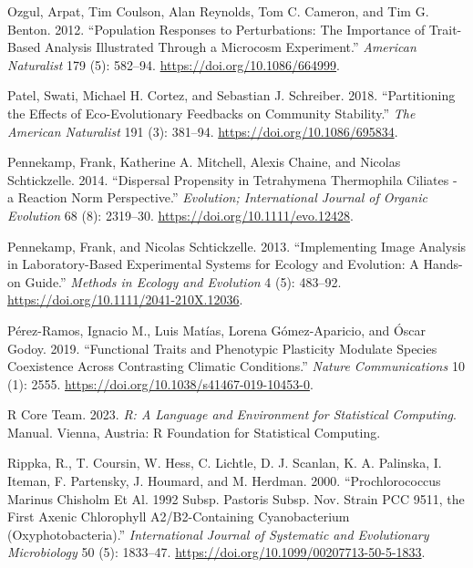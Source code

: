 \documentclass[
  letterpaper,
  DIV=11,
  numbers=noendperiod]{scrartcl}
\newlength{\cslhangindent}
\newenvironment{CSLReferences}[2] %
 {\begin{list}{}{%
  \setlength{\itemindent}{0pt}
  \setlength{\leftmargin}{0pt}
  \setlength{\parsep}{0pt}
  \ifodd #1
   \setlength{\leftmargin}{\cslhangindent}
   \setlength{\itemindent}{-1\cslhangindent}
  \fi
  \setlength{\itemsep}{#2\baselineskip}}}
 {\end{list}}
\begin{document}
\begin{CSLReferences}{1}{0}
Ozgul, Arpat, Tim Coulson, Alan Reynolds, Tom C. Cameron, and Tim G.
Benton. 2012. {``Population Responses to Perturbations: {The} Importance
of Trait-Based Analysis Illustrated Through a Microcosm Experiment.''}
\emph{American Naturalist} 179 (5): 582--94.
\url{https://doi.org/10.1086/664999}.

Patel, Swati, Michael H. Cortez, and Sebastian J. Schreiber. 2018.
{``Partitioning the {Effects} of {Eco-Evolutionary Feedbacks} on
{Community Stability}.''} \emph{The American Naturalist} 191 (3):
381--94. \url{https://doi.org/10.1086/695834}.

Pennekamp, Frank, Katherine A. Mitchell, Alexis Chaine, and Nicolas
Schtickzelle. 2014. {``Dispersal {Propensity} in {Tetrahymena}
Thermophila {Ciliates} - a {Reaction Norm Perspective}.''}
\emph{Evolution; International Journal of Organic Evolution} 68 (8):
2319--30. \url{https://doi.org/10.1111/evo.12428}.

Pennekamp, Frank, and Nicolas Schtickzelle. 2013. {``Implementing Image
Analysis in Laboratory-Based Experimental Systems for Ecology and
Evolution: {A} Hands-on Guide.''} \emph{Methods in Ecology and
Evolution} 4 (5): 483--92.
\url{https://doi.org/10.1111/2041-210X.12036}.

Pérez-Ramos, Ignacio M., Luis Matías, Lorena Gómez-Aparicio, and Óscar
Godoy. 2019. {``Functional Traits and Phenotypic Plasticity Modulate
Species Coexistence Across Contrasting Climatic Conditions.''}
\emph{Nature Communications} 10 (1): 2555.
\url{https://doi.org/10.1038/s41467-019-10453-0}.

R Core Team. 2023. \emph{R: {A} Language and Environment for Statistical
Computing}. Manual. {Vienna, Austria}: {R Foundation for Statistical
Computing}.

Rippka, R., T. Coursin, W. Hess, C. Lichtle, D. J. Scanlan, K. A.
Palinska, I. Iteman, F. Partensky, J. Houmard, and M. Herdman. 2000.
{``Prochlorococcus Marinus {Chisholm} Et Al. 1992 Subsp. Pastoris Subsp.
Nov. Strain {PCC} 9511, the First Axenic Chlorophyll A2/B2-Containing
Cyanobacterium ({Oxyphotobacteria}).''} \emph{International Journal of
Systematic and Evolutionary Microbiology} 50 (5): 1833--47.
\url{https://doi.org/10.1099/00207713-50-5-1833}.


\end{CSLReferences}
\end{document}
